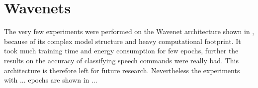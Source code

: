 
\section{Wavenets}
The very few experiments were performed on the Wavenet architecture shown in , because of its complex model structure and heavy computational footprint.
It took much training time and energy consumption for few epochs, further the results on the accuracy of classifying speech commands were really bad.
This architecture is therefore left for future research.
Nevertheless the experiments with ... epochs are shown in ... 
